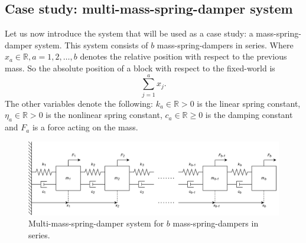 \subsection{Case study: multi-mass-spring-damper system}
Let us now introduce the system that will be used as a case study: a mass-spring-damper system. This system consists of $b$ mass-spring-dampers in series. Where $x_a \in \mathbb{R},a=1,2,\dots,b$ denotes the relative position with respect to the previous mass. So the absolute position of a block with respect to the fixed-world is
\begin{equation}\label{eqn:mass-position-wrt-fixed-world}
    \sum^{a}_{j=1}x_j.
\end{equation}
The other variables denote the following: $k_a\in \mathbb{R}>0$ is the linear spring constant, $\eta_a\in \mathbb{R}>0$ is the nonlinear spring constant, $c_a\in \mathbb{R}\geq0$ is the damping constant and $F_a$ is a force acting on the mass.
\begin{figure}[ht]
    \centering
    \includegraphics[width=0.9\linewidth]{report/Figures/Mass-spring-damper system.png}
    \caption{Multi-mass-spring-damper system for $b$ mass-spring-dampers in series.}
    \label{fig:mass-spring-damper-system-series}
\end{figure}

